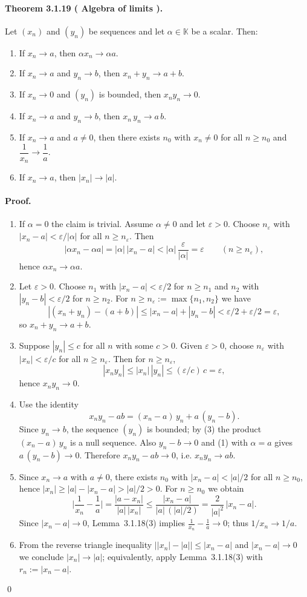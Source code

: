 \documentclass[12pt,a4paper]{article}
\newcommand{\K}{\mathbb{K}} %
\newcommand{\eps}{\varepsilon}
\newcommand{\NumberedTheorem}[3]{%
\paragraph*{Theorem #1 ( #2 ).} #3\par}
\theoremstyle{plain}
\theoremstyle{definition}
\theoremstyle{remark}
\begin{document}
\NumberedTheorem{3.1.19}{Algebra of limits}{Let $(x_n)$ and $(y_n)$ be sequences and let $\alpha\in\K$ be a scalar. Then:
\begin{enumerate}[label={(\arabic*)}, leftmargin=*]
	\item If $x_n\to a$, then $\alpha x_n\to \alpha a$.
	\item If $x_n\to a$ and $y_n\to b$, then $x_n+y_n\to a+b$.
	\item If $x_n\to 0$ and $(y_n)$ is bounded, then $x_n y_n\to 0$.
	\item If $x_n\to a$ and $y_n\to b$, then $x_n\,y_n\to a\,b$.
	\item If $x_n\to a$ and $a\ne0$, then there exists $n_0$ with $x_n\ne0$ for all $n\ge n_0$ and $\dfrac{1}{x_n}\to \dfrac{1}{a}$.
	\item If $x_n\to a$, then $|x_n|\to |a|$.
\end{enumerate}
\paragraph{Proof.}
\begin{enumerate}[label={(\arabic*)}, leftmargin=*]
	\item If $\alpha=0$ the claim is trivial. Assume $\alpha\ne0$ and let $\eps>0$. Choose $n_\eps$ with $|x_n-a|<\eps/|\alpha|$ for all $n\ge n_\eps$. Then
	\[
		|\alpha x_n-\alpha a| = |\alpha|\,|x_n-a| < |\alpha|\,\frac{\eps}{|\alpha|} = \eps
		\qquad (n\ge n_\eps),
	\]
	hence $\alpha x_n\to \alpha a$.
	\item Let $\eps>0$. Choose $n_1$ with $|x_n-a|<\eps/2$ for $n\ge n_1$ and $n_2$ with $|y_n-b|<\eps/2$ for $n\ge n_2$. For $n\ge n_\eps:=\max\{n_1,n_2\}$ we have
	\[
		|(x_n+y_n)-(a+b)| \le |x_n-a|+|y_n-b| < \eps/2+\eps/2 = \eps,
	\]
	so $x_n+y_n\to a+b$.
	\item Suppose $|y_n|\le c$ for all $n$ with some $c>0$. Given $\eps>0$, choose $n_\eps$ with $|x_n|<\eps/c$ for all $n\ge n_\eps$. Then for $n\ge n_\eps$,
	\[
		|x_n y_n| \le |x_n|\,|y_n| \le (\eps/c)\,c = \eps,
	\]
	hence $x_n y_n\to 0$.
	\item Use the identity
	\[
		 x_n y_n - ab = (x_n-a)\,y_n + a\,(y_n-b).
	\]
	Since $y_n\to b$, the sequence $(y_n)$ is bounded; by (3) the product $(x_n-a)\,y_n$ is a null sequence. Also $y_n-b\to0$ and (1) with $\alpha=a$ gives $a\,(y_n-b)\to0$. Therefore $x_n y_n - ab\to0$, i.e. $x_n y_n\to ab$.
	\item Since $x_n\to a$ with $a\ne0$, there exists $n_0$ with $|x_n-a|<|a|/2$ for all $n\ge n_0$, hence $|x_n|\ge |a|-|x_n-a| > |a|/2>0$. For $n\ge n_0$ we obtain
	\[
		\Big|\frac{1}{x_n}-\frac{1}{a}\Big| = \frac{|a-x_n|}{|a|\,|x_n|}
		\le \frac{|x_n-a|}{|a|\,(|a|/2)} = \frac{2}{|a|^2}\,|x_n-a|.
	\]
	Since $|x_n-a|\to0$, Lemma~3.1.18(3) implies $\frac{1}{x_n}-\frac{1}{a}\to0$; thus $1/x_n\to 1/a$.
	\item From the reverse triangle inequality $\big||x_n|-|a|\big|\le |x_n-a|$ and $|x_n-a|\to0$ we conclude $|x_n|\to |a|$; equivalently, apply Lemma~3.1.18(3) with $r_n:=|x_n-a|$.
\end{enumerate}
\qed}
\end{document}
